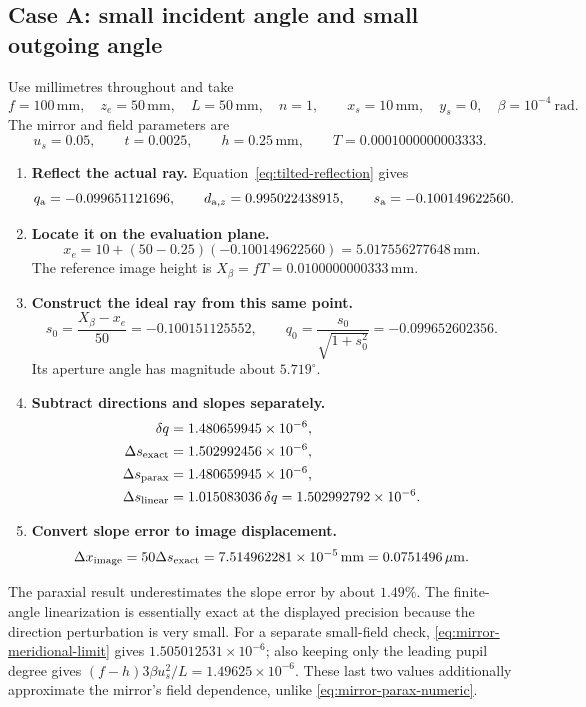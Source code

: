 \documentclass[11pt,a4paper]{article}
\numberwithin{equation}{section}
\newcommand{\mm}{\,\mathrm{mm}}
\newcommand{\um}{\,\mu\mathrm{m}}
\begin{document}
\subsection{Case A: small incident angle and small outgoing angle}
Use millimetres throughout and take
\[
 f=100\mm,\quad z_e=50\mm,\quad L=50\mm,\quad n=1,
 \qquad x_s=10\mm,\quad y_s=0,\quad\beta=10^{-4}\ \mathrm{rad}.
\]
The mirror and field parameters are
\[
 u_s=0.05,\qquad t=0.0025,\qquad h=0.25\mm,
 \qquad T=0.0001000000003333.
\]
\begin{enumerate}
 \item \textbf{Reflect the actual ray.}
 Equation~\eqref{eq:tilted-reflection} gives
 \[
 q_{\rm a}=-0.099651121696,\qquad
 d_{{\rm a},z}=0.995022438915,\qquad
 s_{\rm a}=-0.100149622560.
 \]
 \item \textbf{Locate it on the evaluation plane.}
 \[
 x_e=10+(50-0.25)(-0.100149622560)
     =5.017556277648\mm.
 \]
 The reference image height is
 $X_\beta=fT=0.0100000000333\mm$.
 \item \textbf{Construct the ideal ray from this same point.}
 \[
 s_0=\frac{X_\beta-x_e}{50}=-0.100151125552,
 \qquad
 q_0=\frac{s_0}{\sqrt{1+s_0^2}}=-0.099652602356.
 \]
 Its aperture angle has magnitude about $5.719^\circ$.
 \item \textbf{Subtract directions and slopes separately.}
 \begin{align*}
 \delta q&=1.480659945\times10^{-6},\\
 \Delta s_{\rm exact}&=1.502992456\times10^{-6},\\
 \Delta s_{\rm parax}&=1.480659945\times10^{-6},\\
 \Delta s_{\rm linear}
 &=1.015083036\,\delta q
   =1.502992792\times10^{-6}.
 \end{align*}
 \item \textbf{Convert slope error to image displacement.}
 \[
 \Delta x_{\rm image}
 =50\Delta s_{\rm exact}
 =7.514962281\times10^{-5}\mm
 =0.0751496\um.
 \]
\end{enumerate}
The paraxial result underestimates the slope error by about $1.49\%$.
The finite-angle linearization is essentially exact at the displayed
precision because the direction perturbation is very small.
For a separate small-field check,
\eqref{eq:mirror-meridional-limit} gives $1.505012531\times10^{-6}$;
also keeping only the leading pupil degree gives
$(f-h)3\beta u_s^2/L=1.49625\times10^{-6}$.
These last two values additionally approximate the mirror's field
dependence, unlike \eqref{eq:mirror-parax-numeric}.
\end{document}
